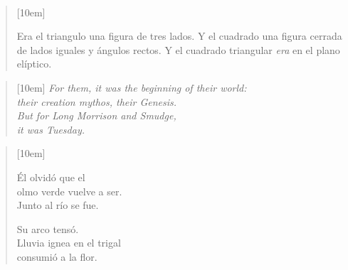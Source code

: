 \\[0.1cm]

\begin{verse}[10em]
\begin{altverse}
Era el triangulo una figura de tres lados. Y el cuadrado una figura cerrada de lados iguales y ángulos rectos. Y el cuadrado triangular {\it era} en el plano elíptico.
\end{altverse}
\end{verse}

\begin{verse}[10em]
{\it For them, it was the beginning of their world:\\
their creation mythos, their Genesis.\\
But for Long Morrison and Smudge,\\
it was Tuesday.\\}
\end{verse}

\begin{verse}[10em]
\begin{altverse}
Él olvidó que el\\
olmo verde vuelve a ser.\\
Junto al río se fue.\\
\end{altverse}
\begin{altverse}
Su arco tensó.\\
Lluvia ignea en el trigal\\
consumió a la flor.\\
\end{altverse}
\end{verse}